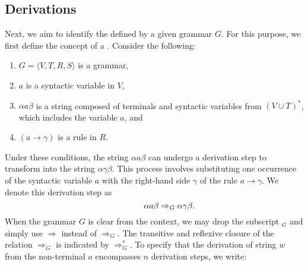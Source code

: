 \subsection{Derivations}
Next, we aim to identify the  defined by a given grammar \( G \). For this purpose, we first
define the concept of a . Consider the following: 
\begin{enumerate}
\item \( G = \langle V, T, R, S \rangle \) is a grammar,
\item \( a \) is a syntactic variable in \( V \),
\item \( \alpha a \beta \) is a string composed of terminals and syntactic variables from \( (V \cup T)^* \), which includes the variable \( a \), and
\item \( (a \rightarrow \gamma) \) is a rule in \( R \).
\end{enumerate}
Under these conditions, the string \( \alpha a \beta \) can undergo a derivation step to transform into the
string \( \alpha \gamma \beta \). This process involves substituting one occurrence of the syntactic variable
\( a \) with the right-hand side \( \gamma \) of the rule \( a \rightarrow \gamma \). We denote this derivation
step as 
\[
\hspace*{1.3cm}
\alpha a \beta \Rightarrow_G \alpha \gamma \beta.
\]
When the grammar \( G \) is clear from the context, we may drop the subscript \( _G \) and simply use \( \Rightarrow \) instead of \( \Rightarrow_G \). The transitive and reflexive closure of the relation \( \Rightarrow_G \) is indicated by \( \Rightarrow_G^* \). To specify that the derivation of string \( w \) from the non-terminal \( a \) encompasses \( n \) derivation steps, we write:

